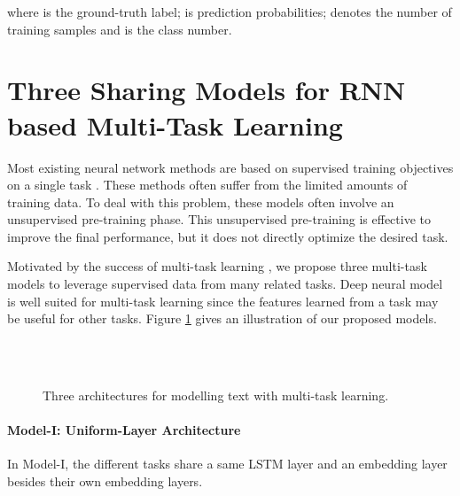 \documentclass{article}
\begin{document}
where  is the ground-truth label;  is prediction probabilities;  denotes the number of training samples and  is the class number.  

\section{Three Sharing Models for RNN based Multi-Task Learning}


Most existing neural network methods are based on supervised training objectives on a single task \cite{collobert2011natural,socher2013recursive,kalchbrenner2014convolutional}. These methods often suffer from the limited amounts of training data. To deal with this problem, these models often involve an unsupervised pre-training phase. This unsupervised pre-training is effective to improve the final performance, but it does not directly optimize the desired task.

Motivated by the success of multi-task learning \cite{caruana1997multitask}, we propose three multi-task models to leverage supervised data from many related tasks. Deep neural model is well suited for multi-task learning since the features learned from a task may be useful for other tasks. Figure \ref{fig:ours} gives an illustration of our proposed models.









{\begin{figure}[t]
  \centering \hspace{-3em}
  \\  \hspace{-3em}
  \\\hspace{-3em}
  \caption{Three architectures for modelling text with multi-task learning.
   }\label{fig:ours}
\end{figure}
}



\paragraph{Model-I: Uniform-Layer Architecture}
In Model-I, the different tasks share a same LSTM layer and an embedding layer besides their own embedding layers.
\end{document}

